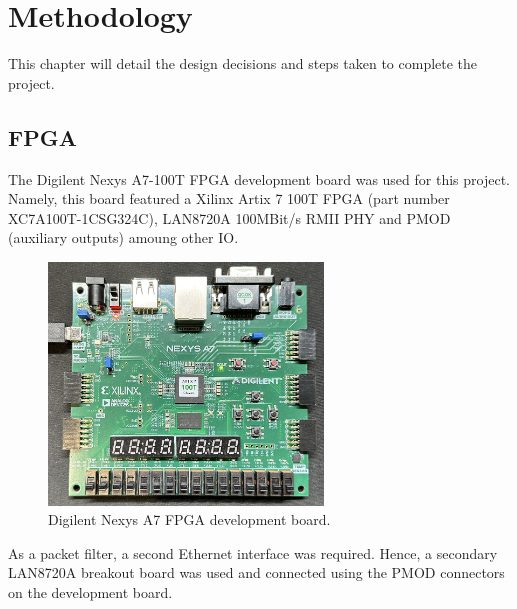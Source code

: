
\chapter[Methodology]{Methodology}
\label{chap:methodology}	%
\pagestyle{headings}

This chapter will detail the design decisions and steps taken to complete the project. 


\section{FPGA}
The Digilent Nexys A7-100T FPGA development board was used for this project. Namely, this board featured a Xilinx Artix 7 100T FPGA (part number XC7A100T-1CSG324C), LAN8720A 100MBit/s RMII PHY and PMOD (auxiliary outputs) amoung other IO. 


\begin{figure}[h]
    \centering
    \includegraphics[width=0.65\textwidth]{Images/nexysa7_board.jpg}
    \caption[Digilent Nexys A7 FPGA development board]{Digilent Nexys A7 FPGA development board.}
    \label{fig:fpga_dev_board}
\end{figure}


As a packet filter, a second Ethernet interface was required. Hence, a secondary LAN8720A breakout board was used and connected using the PMOD connectors on the development board. 


